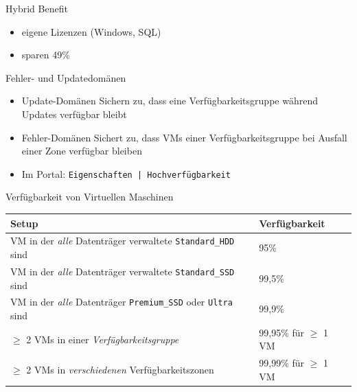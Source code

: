 
\begin{flashcard}[Definition]{Hybrid Benefit}
    \begin{itemize}
        \item eigene Lizenzen (Windows, SQL)
        \item sparen 49\%
    \end{itemize}
\end{flashcard}


\begin{flashcard}[Definition]{Fehler- und Updatedomänen}
    \begin{itemize}
        \item Update-Domänen\newline
            Sichern zu, dass eine Verfügbarkeitsgruppe während Updates verfügbar bleibt
        \item Fehler-Domänen\newline
            Sichert zu, dass VMs einer Verfügbarkeitsgruppe bei Ausfall einer Zone verfügbar bleiben
        \item Im Portal:\newline
            \texttt{Eigenschaften | Hochverfügbarkeit}
    \end{itemize}
\end{flashcard}

\begin{flashcard}[Definition]{Verfügbarkeit von Virtuellen Maschinen}
    \begin{tabular}{l|l}
        Setup                                                                            & Verfügbarkeit            \\
        \hline
        VM in der \emph{alle} Datenträger verwaltete \texttt{Standard\_HDD} sind         & 95\%                     \\
        VM in der \emph{alle} Datenträger verwaltete \texttt{Standard\_SSD} sind         & 99,5\%                   \\
        VM in der \emph{alle} Datenträger \texttt{Premium\_SSD} oder \texttt{Ultra} sind & 99,9\%                   \\
        $\geq$ 2 VMs in einer \emph{Verfügbarkeitsgruppe}                                & 99,95\% für $\geq$ 1 VM  \\
        $\geq$ 2 VMs in \emph{verschiedenen} Verfügbarkeitszonen                         & 99,99\% für $\geq$ 1 VM
    \end{tabular}
\end{flashcard}

